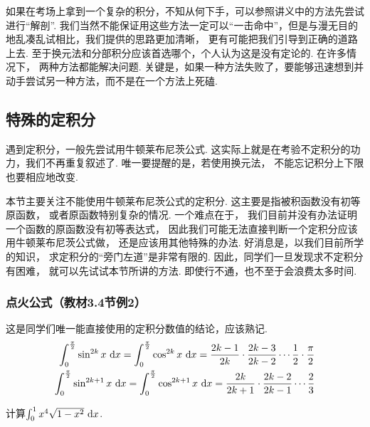 \clearpage

如果在考场上拿到一个复杂的积分，不知从何下手，可以参照讲义中的方法先尝试进行“解剖”.
我们当然不能保证用这些方法一定可以“一击命中”，但是与漫无目的地乱凑乱试相比，我们提供的思路更加清晰，
更有可能把我们引导到正确的道路上去. 至于换元法和分部积分应该首选哪个，个人认为这是没有定论的. 在许多情况下，
两种方法都能解决问题. 关键是，如果一种方法失败了，要能够迅速想到并动手尝试另一种方法，而不是在一个方法上死磕.\par

\subsection{特殊的定积分}\par
遇到定积分，一般先尝试用牛顿莱布尼茨公式. 这实际上就是在考验不定积分的功力，我们不再重复叙述了. 唯一要提醒的是，若使用换元法，
不能忘记积分上下限也要相应地改变.

本节主要关注不能使用牛顿莱布尼茨公式的定积分.
这主要是指被积函数没有初等原函数，
或者原函数特别复杂的情况.
一个难点在于，
我们目前并没有办法证明一个函数的原函数没有初等表达式，
因此我们可能无法直接判断一个定积分应该用牛顿莱布尼茨公式做，
还是应该用其他特殊的办法.
好消息是，以我们目前所学的知识，
求定积分的“旁门左道”是非常有限的.
因此，同学们一旦发现求不定积分有困难，
就可以先试试本节所讲的方法.
即使行不通，也不至于会浪费太多时间.

\subsubsection{点火公式（教材3.4节例2）}

这是同学们唯一能直接使用的定积分数值的结论，应该熟记.
\begin{equation}
    \setlength\abovedisplayskip{12pt}
    \setlength\belowdisplayskip{12pt}
    \begin{aligned}
        \int_{0}^{\frac{\pi}{2}}\sin^{2k}x~\d x = \int_{0}^{\frac{\pi}{2}}\cos^{2k}x~\d x = \frac{2k-1}{2k}\cdot \frac{2k-3}{2k-2} \cdots \frac{1}{2}\cdot \frac{\pi}{2} \\
        \int_{0}^{\frac{\pi}{2}}\sin^{2k+1}x~\d x = \int_{0}^{\frac{\pi}{2}}\cos^{2k+1}x~\d x = \frac{2k}{2k+1}\cdot \frac{2k-2}{2k-1} \cdots \frac{2}{3}
        \nonumber
    \end{aligned}
\end{equation}

\begin{example}
\label{ex:ch03-30}
计算$\int_{0}^{1} x^4\sqrt{1-x^2}~\mathrm{d} x$.
\end{example}

